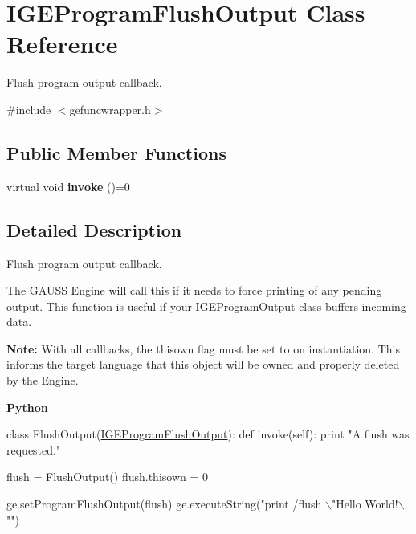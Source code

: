 \hypertarget{class_i_g_e_program_flush_output}{}\section{I\+G\+E\+Program\+Flush\+Output Class Reference}
\label{class_i_g_e_program_flush_output}


Flush program output callback.  




{\ttfamily \#include $<$gefuncwrapper.\+h$>$}

\subsection*{Public Member Functions}
\begin{DoxyCompactItemize}
\item 
\mbox{\label{class_i_g_e_program_flush_output_a2143086c607a7caac7f5e201cee512d3}} 
virtual void {\bfseries invoke} ()=0
\end{DoxyCompactItemize}


\subsection{Detailed Description}
Flush program output callback. 

The \hyperlink{class_g_a_u_s_s}{G\+A\+U\+SS} Engine will call this if it needs to force printing of any pending output. This function is useful if your \hyperlink{class_i_g_e_program_output}{I\+G\+E\+Program\+Output} class buffers incoming data.

{\bfseries Note\+:} With all callbacks, the {\ttfamily thisown} flag must be set to {} on instantiation. This informs the target language that this object will be owned and properly deleted by the Engine.

{\bfseries Python} 
\begin{DoxyCode}
\textcolor{keyword}{class }FlushOutput(\hyperlink{class_i_g_e_program_flush_output}{IGEProgramFlushOutput}):
    \textcolor{keyword}{def }invoke(self):
        \textcolor{keywordflow}{print} \textcolor{stringliteral}{"A flush was requested."}

flush = FlushOutput()
flush.thisown = 0

ge.setProgramFlushOutput(flush)
ge.executeString(\textcolor{stringliteral}{"print /flush \(\backslash\)"Hello World!\(\backslash\)""})
\end{DoxyCode}


